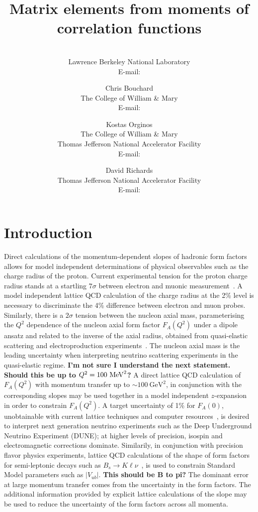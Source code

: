 \documentclass{PoS}
\title{Matrix elements from moments of correlation functions}
\author{\speaker{Chia Cheng Chang}\\
        Lawrence Berkeley National Laboratory\\
        E-mail: \email{chiachang@lbl.gov}}
\author{Chris Bouchard\\
                The College of William \& Mary\\
                E-mail: \email{cmbouchard@wm.edu}}
\author{Kostas Orginos\\
                The College of William \& Mary \\
Thomas Jefferson National Accelerator Facility\\
E-mail: \email{kostas@wm.edu}}
\author{David Richards\\
Thomas Jefferson National Accelerator Facility\\
E-mail: \email{djr@jlab.org}}
\newcommand{\dgr}[1]{\textcolor{David}{#1}}
\begin{document}
\section{Introduction}
Direct calculations of the \dgr{momentum-dependent} slopes of hadronic form factors
allows for model independent determinations of physical observables
such as the charge radius of the proton.  Current experimental tension
for the proton charge radius stands at a startling $7\sigma$ between
electron and muonic measurement~\cite{Carlson:2015jba}. A model
independent lattice QCD calculation of the charge radius at the 2\%
level is necessary to discriminate the 4\% difference between electron
and muon probes. \dgr{Similarly, there is a $2\sigma$ tension between
  the nucleon axial mass, parameterising the $Q^2$ dependence of
  the nucleon axial form factor $F_A(Q^2)$ under a dipole ansatz and related to the inverse of the axial radius, obtained from}
  quasi-elastic scattering and electroproduction
  experiments~\cite{Anikin:2016teg}.
  The nucleon axial mass is
  \dgr{ the leading uncertainty when interpreting neutrino scattering
    experiments in the quasi-elastic regime.}  \dgr{\bfseries I'm not
    sure I understand the next statement.  Should this be up to $Q^2 =
    100~{\rm MeV}^2$?} A direct lattice QCD calculation of $F_A(Q^2)$
  with momentum transfer up to $\sim100~\text{GeV}^2$, in conjunction
  with the corresponding slopes may be used together in a model
  independent $z$-expansion~\cite{Bhattacharya:2011ah} in order to
  constrain $F_A(Q^2)$.  A target uncertainty of 1\% for $F_A(0)$,
  unobtainable with current lattice techniques and
  computer resources~\cite{Bhattacharya:2016zcn}, is desired to interpret next
  generation neutrino experiments such as the Deep Underground
  Neutrino Experiment (DUNE);
\dgr{at higher levels of precision,} isospin and electromagnetic
  corrections dominate.  Similarily, in conjunction with precision
  flavor physics experiments, lattice QCD calculations of the shape of
  form factors for semi-leptonic decays such as $B_s\rightarrow K \ell
  \nu$~\cite{Bouchard:2014ypa}, is used to constrain Standard Model
  parameters such as $|V_{ub}|$. \dgr{\bfseries This should be B to pi?}  The dominant error at large momentum
  transfer comes from the uncertainty in the form factors. The
  additional information provided by explicit lattice calculations of
  the slope may be used to reduce the uncertainty of the form factors
  across all momenta.
\end{document}
